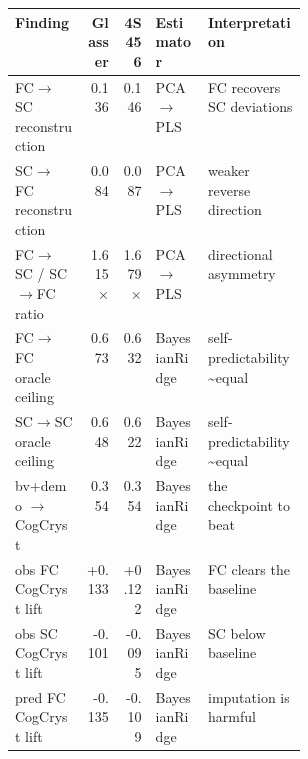 \begin{tabular}{@{}lrrlp{0.34\linewidth}@{}}
\toprule
\textbf{Finding} & \textbf{Glasser} & \textbf{4S456} & \textbf{Estimator} & \textbf{Interpretation} \\
\midrule
FC$\rightarrow$SC reconstruction & 0.136 & 0.146 & PCA$\rightarrow$PLS & FC recovers SC deviations \\
SC$\rightarrow$FC reconstruction & 0.084 & 0.087 & PCA$\rightarrow$PLS & weaker reverse direction \\
FC$\rightarrow$SC / SC$\rightarrow$FC ratio & 1.615$\times$ & 1.679$\times$ & PCA$\rightarrow$PLS & directional asymmetry \\
FC$\rightarrow$FC oracle ceiling & 0.673 & 0.632 & BayesianRidge & self-predictability \textasciitilde{}equal \\
SC$\rightarrow$SC oracle ceiling & 0.648 & 0.622 & BayesianRidge & self-predictability \textasciitilde{}equal \\
bv+demo $\rightarrow$ CogCryst & 0.354 & 0.354 & BayesianRidge & the checkpoint to beat \\
obs FC CogCryst lift & +0.133 & +0.122 & BayesianRidge & FC clears the baseline \\
obs SC CogCryst lift & -0.101 & -0.095 & BayesianRidge & SC below baseline \\
pred FC CogCryst lift & -0.135 & -0.109 & BayesianRidge & imputation is harmful \\
\bottomrule
\end{tabular}
